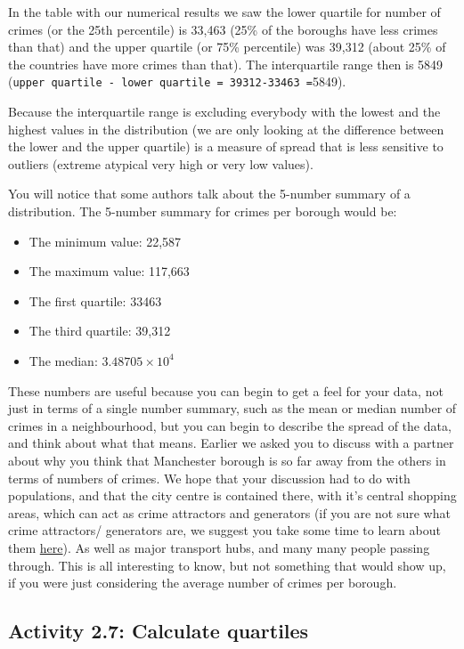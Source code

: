 \documentclass[
]{book}
\providecommand{\tightlist}{%
  \setlength{\itemsep}{0pt}\setlength{\parskip}{0pt}}
\begin{document}
In the table with our numerical results we saw the lower quartile for number of crimes (or the 25th percentile) is 33,463 (25\% of the boroughs have less crimes than that) and the upper quartile (or 75\% percentile) was 39,312 (about 25\% of the countries have more crimes than that). The interquartile range then is 5849 (\texttt{upper\ quartile\ -\ lower\ quartile\ =\ 39312-33463\ =}5849).

Because the interquartile range is excluding everybody with the lowest and the highest values in the distribution (we are only looking at the difference between the lower and the upper quartile) is a measure of spread that is less sensitive to outliers (extreme atypical very high or very low values).

You will notice that some authors talk about the 5-number summary of a distribution. The 5-number summary for crimes per borough would be:

\begin{itemize}
\tightlist
\item
  The minimum value: 22,587
\item
  The maximum value: 117,663
\item
  The first quartile: 33463
\item
  The third quartile: 39,312
\item
  The median: \ensuremath{3.48705\times 10^{4}}
\end{itemize}

These numbers are useful because you can begin to get a feel for your data, not just in terms of a single number summary, such as the mean or median number of crimes in a neighbourhood, but you can begin to describe the spread of the data, and think about what that means. Earlier we asked you to discuss with a partner about why you think that Manchester borough is so far away from the others in terms of numbers of crimes. We hope that your discussion had to do with populations, and that the city centre is contained there, with it's central shopping areas, which can act as crime attractors and generators (if you are not sure what crime attractors/ generators are, we suggest you take some time to learn about them \href{https://www.ncjrs.gov/App/Publications/abstract.aspx?ID=158108}{here}). As well as major transport hubs, and many many people passing through. This is all interesting to know, but not something that would show up, if you were just considering the average number of crimes per borough.

\hypertarget{activity-2.7-calculate-quartiles}{%
\subsection{Activity 2.7: Calculate quartiles}\label{activity-2.7-calculate-quartiles}}
\end{document}
